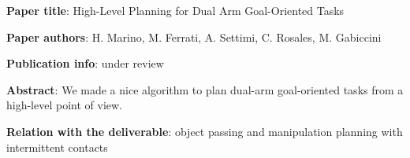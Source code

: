 
\item
\begin{list}{\quad}{}
\item \textbf{Paper title}: High-Level Planning for Dual Arm Goal-Oriented Tasks
\item \textbf{Paper authors}: H. Marino, M. Ferrati, A. Settimi, C. Rosales, M. Gabiccini
\item\textbf{Publication info}: under review
\item\textbf{Abstract}: We made a nice algorithm to plan dual-arm goal-oriented tasks from a high-level point of view.
\item \textbf{Relation with the deliverable}: object passing and manipulation planning with intermittent contacts
\end{list}